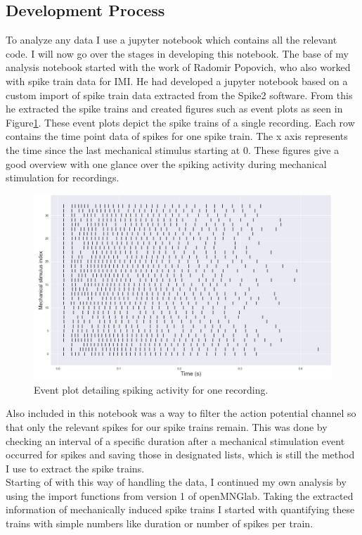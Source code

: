\subsection{Development Process}
To analyze any data I use a jupyter notebook which contains all the relevant code. I will now go over the stages in developing this notebook.
The base of my analysis notebook started with the work of Radomir Popovich, who also worked with spike train data for IMI. He had developed a jupyter notebook based on a custom import of spike train data extracted from the Spike2 software. From this he extracted the spike trains and created figures such as event plots as seen in Figure\ref{fig:eventplot}. These event plots depict the spike trains of a single recording. Each row contains the time point data of spikes for one spike train. The x axis represents the time since the last mechanical stimulus starting at 0. These figures give a good overview with one glance over the spiking activity during mechanical stimulation for recordings.
\begin{figure}
	\includegraphics[width = \textwidth]{src/pic/event_plot}
	\caption{Event plot detailing spiking activity for one recording.}
	\label{fig:eventplot}
\end{figure}
Also included in this notebook was a way to filter the action potential channel so that only the relevant spikes for our spike trains remain. This was done by checking an interval of a specific duration after a mechanical stimulation event occurred for spikes and saving those in designated lists, which is still the method I use to extract the spike trains.\\
Starting of with this way of handling the data, I continued my own analysis by using the import functions from version 1 of openMNGlab. Taking the extracted information of mechanically induced spike trains I started with quantifying these trains with simple numbers like duration or number of spikes per train.\\
